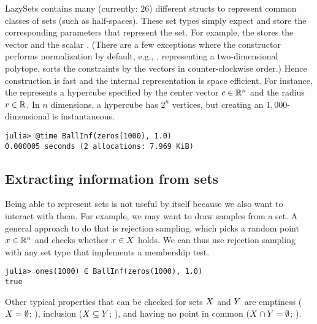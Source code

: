 \smallskip

LazySets contains many (currently: $26$) different structs to represent common classes of sets (such as half-spaces).
These set types simply expect and store the corresponding parameters that represent the set.
For example, the  stores the vector  and the scalar .
(There are a few exceptions where the constructor performs normalization by default, e.g., , representing a two-dimensional polytope, sorts the constraints by the vectors  in counter-clockwise order.)
Hence construction is fast and the internal representation is space efficient.
For instance, the  represents a hypercube specified by the center vector $c \in \mathbb{R}^n$ and the radius $r \in \mathbb{R}$.
In $n$ dimensions, a hypercube has $2^n$ vertices, but creating an $1{,}000$-dimensional  is instantaneous.

\begin{minipage}{\linewidth}
\begin{lstlisting}
julia> @time BallInf(zeros(1000), 1.0)
0.000005 seconds (2 allocations: 7.969 KiB)
\end{lstlisting}
\end{minipage}


\subsection{Extracting information from sets}

Being able to represent sets is not useful by itself because we also want to interact with them.
For example, we may want to draw samples from a set.
A general approach to do that is rejection sampling, which picks a random point $x \in \mathbb{R}^n$ and checks whether $x \in X$ holds.
We can thus use rejection sampling with any set type that implements a membership test.

\begin{minipage}{\linewidth}
\begin{lstlisting}
julia> ones(1000) ∈ BallInf(zeros(1000), 1.0)
true
\end{lstlisting}
\end{minipage}

Other typical properties that can be checked for sets $X$ and $Y$ are emptiness ($X = \emptyset$; ), inclusion ($X \subseteq Y$; ), and having no point in common ($X \cap Y = \emptyset$; ).

\smallskip

